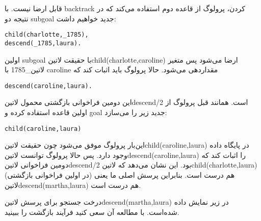قابل ارضا نیست. با backtrack کردن، پرولوگ از قاعده دوم استفاده می‌کند که در نتیجه دو subgoal جدید خواهیم داشت:

\begin{latin}
\begin{lstlisting}
child(charlotte,_1785),
descend(_1785,laura).
\end{lstlisting}
\end{latin}

اولین subgoal با حقیقت ‌لاتین{child(charlotte,caroline)} ارضا می‌شود پس متغیر ‌لاتین{\_1785} با caroline مقداردهی می‌شود. حالا پرولوگ باید اثبات کند که

\begin{latin}
\begin{lstlisting}
descend(caroline,laura).
\end{lstlisting}
\end{latin}

این دومین فراخوانی بازگشتی محمول ‌لاتین{descend/2} است. همانند قبل پرولوگ از اولین قاعده استفاده کرده و goal‌ جدید زیر را می‌سازد:

\begin{latin}
\begin{lstlisting}
child(caroline,laura)
\end{lstlisting}
\end{latin}

این‌بار پرولوگ موفق می‌شود چون حقیقت ‌لاتین{child(caroline,laura)} در پایگاه داده وجود دارد. پس حالا پرولوگ توانست ‌لاتین{descend(caroline,laura)} را اثبات کند که دومین فراخوانی ‌لاتین{descend/2} بود. این نشان می‌دهد که ‌لاتین{child(charlotte,laura)} (در اولین فراخوانی بازگشتی) هم درست است. بنابراین پرسش اصلی ما یعنی ‌لاتین{descend(martha,laura)} هم درست است.

درخت جستجو برای پرسش ‌لاتین{descend(martha,laura)} در زیر نمایش داده شده‌است. با مطالعه آن سعی کنید فرآیند بازگشت را ببینید.

\begin{latin}
\end{latin}

